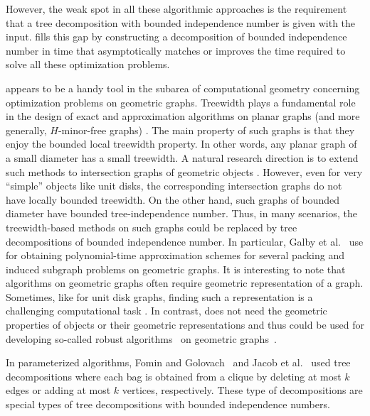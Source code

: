 \documentclass[11pt]{article}
\theoremstyle{definition}
\begin{document}
However, the weak spot in all these algorithmic approaches is the requirement that a tree decomposition with bounded independence number is given with the input.
 fills this gap by constructing a decomposition of bounded independence number
in time that asymptotically matches or improves the time required to solve all these optimization problems.

 appears to be a handy tool in the subarea of computational geometry concerning optimization problems on geometric graphs. Treewidth plays a fundamental role in the design of exact and approximation algorithms on planar graphs (and more generally, $H$-minor-free graphs) \cite{DemaineFHT05jacm,Baker94,Grohe:2003kt}.
The main property of such graphs is that they enjoy the bounded local treewidth property. In other words, any planar graph of a small diameter has a small treewidth. 
A natural research direction is to extend such methods to intersection graphs of geometric objects \cite{FominLS18,LokshtanovPSXZ22}. 
However, even for very ``simple'' objects like unit disks, the corresponding intersection graphs do not have locally bounded treewidth. 
On the other hand, such graphs of bounded diameter have bounded tree-independence number. 
Thus, in many scenarios, the treewidth-based methods on such graphs could be replaced by tree decompositions of bounded independence number.
{In particular,} Galby et al.~\cite{Galby23,DBLP:journals/corr/abs-2402-18352} use  for obtaining polynomial-time approximation schemes for several packing and induced subgraph problems on geometric graphs.
It is interesting to note that algorithms on geometric graphs often require geometric representation of a graph. Sometimes, like for unit disk graphs, finding such a representation is a challenging computational task \cite{HlinenyK01}.
In contrast,  does not need the geometric properties of objects or their geometric representations and thus could be used for developing so-called robust algorithms~\cite{RaghavanS03} on geometric graphs~\cite{ClarkCJ90}.


In parameterized algorithms, Fomin and Golovach~\cite{FominG21} and
Jacob et al.~\cite{DBLP:journals/algorithmica/JacobPRS22} used tree decompositions where each bag is obtained from a clique by deleting at most $k$ edges or adding at most $k$ vertices, respectively.
These type of decompositions are special types of tree decompositions with bounded independence numbers.
\end{document}
